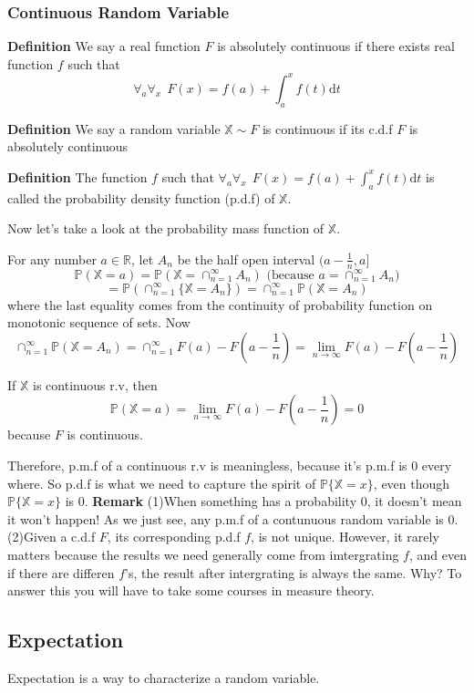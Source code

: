 \documentclass[a4paper,12pt]{article}
\begin{document}
\subsubsection{Continuous Random Variable}
\textbf{Definition} We say a real function $F$ is absolutely continuous if there exists real function $f$ such that
$$\forall_a \forall_x \ \ F(x) = f(a) + \int_a^x f(t) \mathrm{d}t$$

\textbf{Definition}
We say a random variable $\mathbb{X} \sim F$ is continuous if its c.d.f $F$ is absolutely continuous 

\textbf{Definition}
The function $f$ such that $\forall_a \forall_x \ \ F(x) = f(a) + \int_a^x f(t) \mathrm{d}t$ is called the probability density function (p.d.f) of $\mathbb{X}$. 

Now let's take a look at the probability mass function of $\mathbb{\mathbb{X}}$.

For any number $a\in\mathbb{R}$, let $A_n$ be the half open interval $(a-\frac{1}{n}, a]$
$$\mathbb{P}(\mathbb{X}=a) = \mathbb{P}( \mathbb{X} = \cap_{n=1}^\infty A_n )
 \text{\ \ \ (because   } a = \cap_{n=1}^\infty A_n )$$
$$= \mathbb{P}(\cap_{n=1}^\infty\{\mathbb{X} = A_n \}) = \cap_{n=1}^\infty\mathbb{P}(\mathbb{X} = A_n )$$ where the last equality comes from the continuity of probability function on monotonic sequence of sets. Now
$$\cap_{n=1}^\infty\mathbb{P}(\mathbb{X} = A_n ) = \cap_{n=1}^\infty F(a) - F(a-\frac{1}{n}) = \lim_{n\to\infty} F(a) - F(a-\frac{1}{n})$$

If $\mathbb{X}$ is continuous r.v,  then
$$\mathbb{P}(\mathbb{X}=a) = \lim_{n\to\infty} F(a) - F(a-\frac{1}{n}) = 0$$
because $F$ is continuous.

Therefore, p.m.f of a continuous r.v is meaningless, because it's p.m.f is 0 every where. So p.d.f is what we need to capture the spirit of $\mathbb{P}\{\mathbb{X}=x\}$, even though $\mathbb{P}\{\mathbb{X}=x\}$ is $0$.
\textbf{Remark} 
(1)When something has a probability 0, it doesn't mean it won't happen! As we just see, any p.m.f of a contunuous random variable is 0. 
(2)Given a c.d.f $F$, its corresponding p.d.f $f$, is not unique. However, it rarely matters because the results we need generally come from imtergrating $f$, and even if there are differen $f$'s, the result after intergrating is always the same. Why? To answer this you will have to take some courses in measure theory.

\subsection{Expectation}
Expectation is a way to characterize a random variable. 
\end{document}
